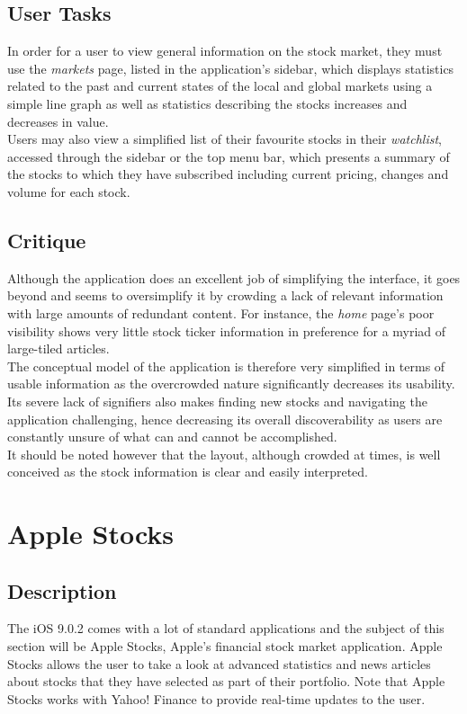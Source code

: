 \documentclass{sigchi}
\begin{document}
\subsection{User Tasks}
In order for a user to view general information on the stock market, they must use the \textit{markets} page, listed in the application's sidebar, which displays statistics related to the past and current states of the local and global markets using a simple line graph as well as statistics describing the stocks increases and decreases in value. \\
Users may also view a simplified list of their favourite stocks in their \textit{watchlist}, accessed through the sidebar or the top menu bar, which presents a summary of the stocks to which they have subscribed including current pricing, changes and volume for each stock.

\subsection{Critique}
Although the application does an excellent job of simplifying the interface, it goes beyond and seems to oversimplify it by crowding a lack of relevant information with large amounts of redundant content. For instance, the \textit{home} page's poor visibility shows very little stock ticker information in preference for a myriad of large-tiled articles. \\
The conceptual model of the application is therefore very simplified in terms of usable information as the overcrowded nature significantly decreases its usability. Its severe lack of signifiers also makes finding new stocks and navigating the application challenging, hence decreasing its overall discoverability as users are constantly unsure of what can and cannot be accomplished. \\
It should be noted however that the layout, although crowded at times, is well conceived as the stock information is clear and easily interpreted.



\section{Apple Stocks}
\subsection{Description}
The iOS 9.0.2 comes with a lot of standard applications and the subject of this section will be Apple Stocks, Apple's financial stock market application. Apple Stocks allows the user to take a look at advanced statistics and news articles about stocks that they have selected as part of their portfolio. Note that Apple Stocks works with Yahoo! Finance to provide real-time updates to the user.
\end{document}
